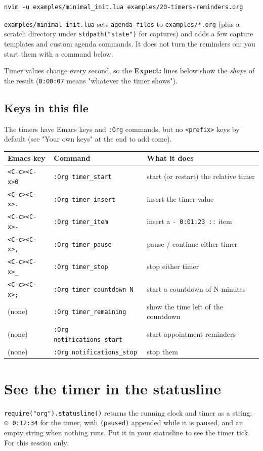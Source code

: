 \begin{verbatim}
nvim -u examples/minimal_init.lua examples/20-timers-reminders.org
\end{verbatim}

\texttt{examples/minimal\_init.lua} sets \texttt{agenda\_files} to \texttt{examples/*.org} (plus a
scratch directory under \texttt{stdpath("state")} for captures) and adds a few
capture templates and custom agenda commands. It does not turn the
reminders on: you start them with a command below.

Timer values change every second, so the \textbf{Expect:} lines below show the
\emph{shape} of the result (\texttt{0:00:07} means "whatever the timer shows").
\subsection{Keys in this file}
\label{sec:org215ba45}
The timers have Emacs keys and \texttt{:Org} commands, but no \texttt{<prefix>} keys by
default (see "Your own keys" at the end to add some).

\begin{center}
\begin{tabular}{lll}
Emacs key & Command & What it does\\
\hline
\texttt{<C-c><C-x>0} & \texttt{:Org timer\_start} & start (or restart) the relative timer\\
\texttt{<C-c><C-x>.} & \texttt{:Org timer\_insert} & insert the timer value\\
\texttt{<C-c><C-x>-} & \texttt{:Org timer\_item} & insert a \texttt{- 0:01:23 ::} item\\
\texttt{<C-c><C-x>,} & \texttt{:Org timer\_pause} & pause / continue either timer\\
\texttt{<C-c><C-x>\_} & \texttt{:Org timer\_stop} & stop either timer\\
\texttt{<C-c><C-x>;} & \texttt{:Org timer\_countdown N} & start a countdown of N minutes\\
(none) & \texttt{:Org timer\_remaining} & show the time left of the countdown\\
(none) & \texttt{:Org notifications\_start} & start appointment reminders\\
(none) & \texttt{:Org notifications\_stop} & stop them\\
\end{tabular}
\end{center}
\section{See the timer in the statusline}
\label{sec:orge87d85b}
\texttt{require("org").statusline()} returns the running clock and timer as a
string: \texttt{⏲ 0:12:34} for the timer, with \texttt{(paused)} appended while it is
paused, and an empty string when nothing runs. Put it in your statusline
to see the timer tick. For this session only:

